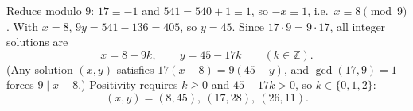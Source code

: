 Reduce modulo \(9\): \(17\equiv -1\) and \(541=540+1\equiv 1\), so \(-x\equiv 1\), i.e.\ \(x\equiv 8\pmod 9\). With \(x=8\), \(9y=541-136=405\), so \(y=45\). Since \(17\cdot 9=9\cdot 17\), all integer solutions are
\[
x=8+9k,\qquad y=45-17k\qquad(k\in\mathbb Z).
\]
(Any solution \((x,y)\) satisfies \(17(x-8)=9(45-y)\), and \(\gcd(17,9)=1\) forces \(9\mid x-8\).) Positivity requires \(k\ge 0\) and \(45-17k>0\), so \(k\in\{0,1,2\}\):
\[
\boxed{(x,y)=(8,45),\ (17,28),\ (26,11)}.
\]
